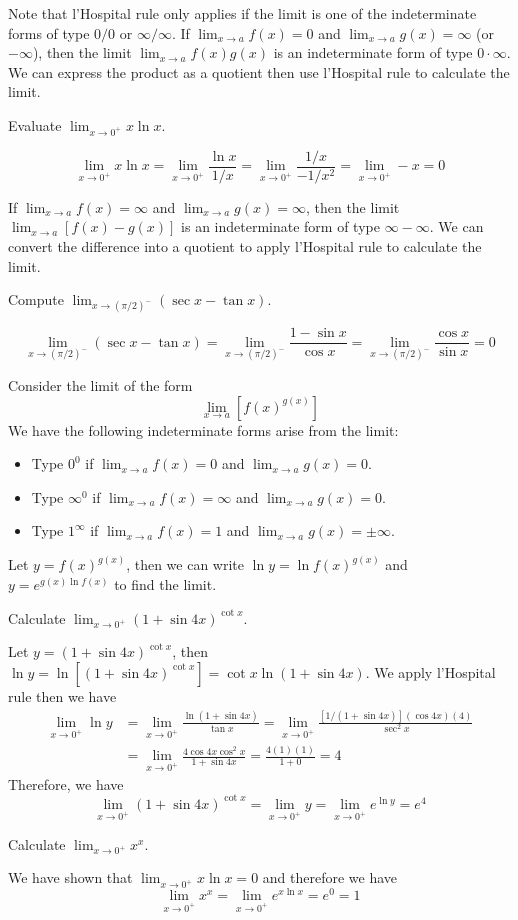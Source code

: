 Note that l'Hospital rule only applies if the limit is one of the
indeterminate forms of type \(0/0\) or \(\infty/\infty\).
If \(\lim_{x\to a}f(x)=0\) and \(\lim_{x\to a}g(x)=\infty\) (or \(-\infty\)),
then the limit \(\lim_{x\to a}f(x)g(x)\) is an indeterminate form of type
\(0\cdot\infty\).
We can express the product as a quotient then use l'Hospital rule to
calculate the limit.
\begin{problem}
    Evaluate \(\lim_{x\to 0^+}x\ln x\).
\end{problem}
\begin{solution}
    \[\lim_{x\to 0^+}x\ln x=\lim_{x\to 0^+}\frac{\ln x}{1/x}
    =\lim_{x\to 0^+}\frac{1/x}{-1/x^2}=\lim_{x\to 0^+}-x=0\]
\end{solution}
If \(\lim_{x\to a}f(x)=\infty\) and \(\lim_{x\to a}g(x)=\infty\), then the
limit \(\lim_{x\to a}[f(x)-g(x)]\) is an indeterminate form of type
\(\infty-\infty\).
We can convert the difference into a quotient to apply l'Hospital rule to
calculate the limit.
\begin{problem}
    Compute \(\lim_{x\to (\pi/2)^-}(\sec x-\tan x)\).
\end{problem}
\begin{solution}
    \[\lim_{x\to (\pi/2)^-}(\sec x-\tan x)
    =\lim_{x\to (\pi/2)^-}\frac{1-\sin x}{\cos x}
    =\lim_{x\to (\pi/2)^-}\frac{\cos x}{\sin x}=0\]
\end{solution}
Consider the limit of the form \[\lim_{x\to a}[f(x)^{g(x)}]\]
We have the following indeterminate forms arise from the limit:
\begin{itemize}
    \item Type \(0^0\) if \(\lim_{x\to a}f(x)=0\) and \(\lim_{x\to a}g(x)=0\).
    \item Type \(\infty^0\) if \(\lim_{x\to a}f(x)=\infty\) and
    \(\lim_{x\to a}g(x)=0\).
    \item Type \(1^\infty\) if \(\lim_{x\to a}f(x)=1\) and
    \(\lim_{x\to a}g(x)=\pm\infty\).
\end{itemize}
Let \(y=f(x)^{g(x)}\), then we can write \(\ln y=\ln f(x)^{g(x)}\) and
\(y=e^{g(x)\ln f(x)}\) to find the limit.
\begin{problem}
    Calculate \(\lim_{x\to 0^+}(1+\sin 4x)^{\cot x}\).
\end{problem}
\begin{solution}
    Let \(y=(1+\sin 4x)^{\cot x}\), then \(\ln y=\ln[(1+\sin 4x)^{\cot x}]=\cot x\ln(1+\sin 4x)\).
    We apply l'Hospital rule then we have
    \begin{align*}
    \lim_{x\to 0^+}\ln y &= \lim_{x\to 0^+}\frac{\ln(1+\sin 4x)}{\tan x}
    =\lim_{x\to 0^+}\frac{[1/(1+\sin 4x)](\cos 4x)(4)}{\sec^2 x} \\
    &= \lim_{x\to 0^+}\frac{4\cos 4x\cos^2 x}{1+\sin 4x}=\frac{4(1)(1)}{1+0}=4
    \end{align*}
    Therefore, we have
    \[\lim_{x\to 0^+}(1+\sin 4x)^{\cot x}=\lim_{x\to 0^+}y
    =\lim_{x\to 0^+}e^{\ln y}=e^4\]
\end{solution}
\begin{problem}
    Calculate \(\lim_{x\to 0^+}x^x\).
\end{problem}
\begin{solution}
    We have shown that \(\lim_{x\to 0^+}x\ln x=0\) and therefore we have
    \[\lim_{x\to 0^+}x^x=\lim_{x\to 0^+}e^{x\ln x}=e^0=1\]
\end{solution}